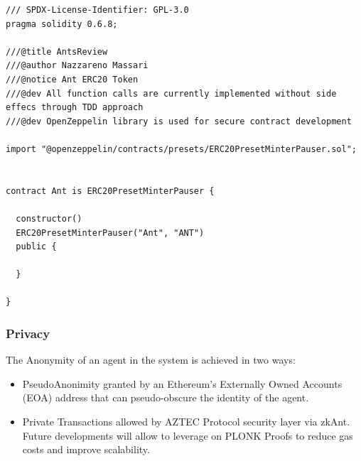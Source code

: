 \documentclass[runningheads]{llncs}
\begin{document}
\begin{lstlisting}[language=Solidity]
/// SPDX-License-Identifier: GPL-3.0
pragma solidity 0.6.8;

///@title AntsReview
///@author Nazzareno Massari
///@notice Ant ERC20 Token
///@dev All function calls are currently implemented without side effecs through TDD approach
///@dev OpenZeppelin library is used for secure contract development

import "@openzeppelin/contracts/presets/ERC20PresetMinterPauser.sol";


contract Ant is ERC20PresetMinterPauser {

  constructor()
  ERC20PresetMinterPauser("Ant", "ANT")
  public {

  }

}
\end{lstlisting}


\subsubsection{Privacy}

The Anonymity of an agent in the system is achieved in two ways:

\begin{itemize}
  \item PseudoAnonimity granted by an Ethereum's Externally Owned Accounts (EOA) address that can pseudo-obscure the identity of the agent.
  \item Private Transactions allowed by AZTEC Protocol security layer via zkAnt. Future developments will allow to leverage on PLONK Proofs to reduce gas costs and improve scalability.
\end{itemize}
\end{document}
